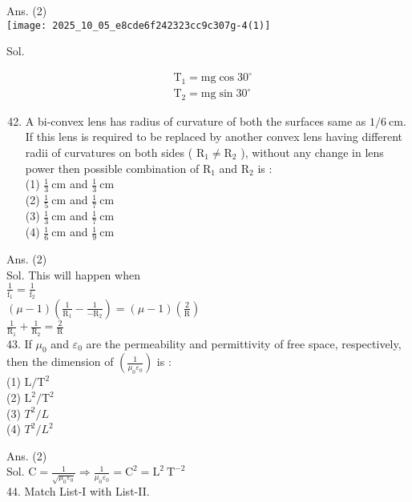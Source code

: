 \documentclass[10pt]{article}
\begin{document}
Ans. (2)\\
\texttt{[image: 2025\_10\_05\_e8cde6f242323cc9c307g-4(1)]}

Sol.

\[
\begin{aligned}
& \mathrm{T}_{1}=\mathrm{mg} \cos 30^{\circ} \\
& \mathrm{T}_{2}=\mathrm{mg} \sin 30^{\circ}
\end{aligned}
\]

\begin{enumerate}
  \setcounter{enumi}{41}
  \item A bi-convex lens has radius of curvature of both the surfaces same as \(1 / 6 \mathrm{~cm}\). If this lens is required to be replaced by another convex lens having different radii of curvatures on both sides ( \(\mathrm{R}_{1} \neq \mathrm{R}_{2}\) ), without any change in lens power then possible combination of \(\mathrm{R}_{1}\) and \(\mathrm{R}_{2}\) is :\\
(1) \(\frac{1}{3} \mathrm{~cm}\) and \(\frac{1}{3} \mathrm{~cm}\)\\
(2) \(\frac{1}{5} \mathrm{~cm}\) and \(\frac{1}{7} \mathrm{~cm}\)\\
(3) \(\frac{1}{3} \mathrm{~cm}\) and \(\frac{1}{7} \mathrm{~cm}\)\\
(4) \(\frac{1}{6} \mathrm{~cm}\) and \(\frac{1}{9} \mathrm{~cm}\)
\end{enumerate}

Ans. (2)\\
Sol. This will happen when\\
\(\frac{1}{\mathrm{f}_{1}}=\frac{1}{\mathrm{f}_{2}}\)\\
\((\mu-1)\left(\frac{1}{\mathrm{R}_{1}}-\frac{1}{-\mathrm{R}_{2}}\right)=(\mu-1)\left(\frac{2}{\mathrm{R}}\right)\)\\
\(\frac{1}{\mathrm{R}_{1}}+\frac{1}{\mathrm{R}_{2}}=\frac{2}{\mathrm{R}}\)\\
43. If \(\mu_{0}\) and \(\varepsilon_{0}\) are the permeability and permittivity of free space, respectively, then the dimension of \(\left(\frac{1}{\mu_{0} \varepsilon_{0}}\right)\) is :\\
(1) \(\mathrm{L} / \mathrm{T}^{2}\)\\
(2) \(\mathrm{L}^{2} / \mathrm{T}^{2}\)\\
(3) \(T^{2} / L\)\\
(4) \(T^{2} / L^{2}\)

Ans. (2)\\
Sol. \(\mathrm{C}=\frac{1}{\sqrt{\mu_{0} \varepsilon_{0}}} \Rightarrow \frac{1}{\mu_{0} \varepsilon_{0}}=\mathrm{C}^{2}=\mathrm{L}^{2} \mathrm{~T}^{-2}\)\\
44. Match List-I with List-II.
\end{document}
